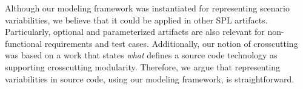 \documentclass{acm_proc_article-sp}
\begin{document}
Although our modeling framework was instantiated for representing 
scenario variabilities, we believe that it could be applied in 
other SPL artifacts. Particularly, optional and parameterized artifacts 
are also relevant for non-functional requirements and test cases. 
Additionally, our notion of crosscutting was based on a work that states \emph{what} 
defines a source code technology as supporting crosscutting modularity. Therefore, 
we argue that representing variabilities in source code, using our modeling framework, 
is straightforward.   


%
%



\end{document}
